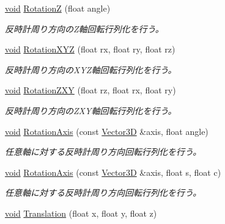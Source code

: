 \begin{DoxyCompactItemize}
\mbox{\hyperlink{namespace_effekseer_ab34c4088e512200cf4c2716f168deb56}{void}} \mbox{\hyperlink{struct_effekseer_1_1_matrix43_a5e37a336a79787b7a45c836403f3bb62}{RotationZ}} (float angle)
\begin{DoxyCompactList}\small\item\em 反時計周り方向の\+Z軸回転行列化を行う。 \end{DoxyCompactList}\item 
\mbox{\hyperlink{namespace_effekseer_ab34c4088e512200cf4c2716f168deb56}{void}} \mbox{\hyperlink{struct_effekseer_1_1_matrix43_aba8560d7ee729de8d32d3e67506ac687}{Rotation\+X\+YZ}} (float rx, float ry, float rz)
\begin{DoxyCompactList}\small\item\em 反時計周り方向の\+X\+Y\+Z軸回転行列化を行う。 \end{DoxyCompactList}\item 
\mbox{\hyperlink{namespace_effekseer_ab34c4088e512200cf4c2716f168deb56}{void}} \mbox{\hyperlink{struct_effekseer_1_1_matrix43_a96455579cd7fa90c40f9a55809b80e49}{Rotation\+Z\+XY}} (float rz, float rx, float ry)
\begin{DoxyCompactList}\small\item\em 反時計周り方向の\+Z\+X\+Y軸回転行列化を行う。 \end{DoxyCompactList}\item 
\mbox{\hyperlink{namespace_effekseer_ab34c4088e512200cf4c2716f168deb56}{void}} \mbox{\hyperlink{struct_effekseer_1_1_matrix43_a4ffc1cca84b357e8d655916eafd251c0}{Rotation\+Axis}} (const \mbox{\hyperlink{struct_effekseer_1_1_vector3_d}{Vector3D}} \&axis, float angle)
\begin{DoxyCompactList}\small\item\em 任意軸に対する反時計周り方向回転行列化を行う。 \end{DoxyCompactList}\item 
\mbox{\hyperlink{namespace_effekseer_ab34c4088e512200cf4c2716f168deb56}{void}} \mbox{\hyperlink{struct_effekseer_1_1_matrix43_a912fd92dbc2c19df890d5cb0da0e0143}{Rotation\+Axis}} (const \mbox{\hyperlink{struct_effekseer_1_1_vector3_d}{Vector3D}} \&axis, float s, float c)
\begin{DoxyCompactList}\small\item\em 任意軸に対する反時計周り方向回転行列化を行う。 \end{DoxyCompactList}\item 
\mbox{\hyperlink{namespace_effekseer_ab34c4088e512200cf4c2716f168deb56}{void}} \mbox{\hyperlink{struct_effekseer_1_1_matrix43_ab86a1212ba446b26d684b7f4b2361b64}{Translation}} (float x, float y, float z)

\end{DoxyCompactItemize}
